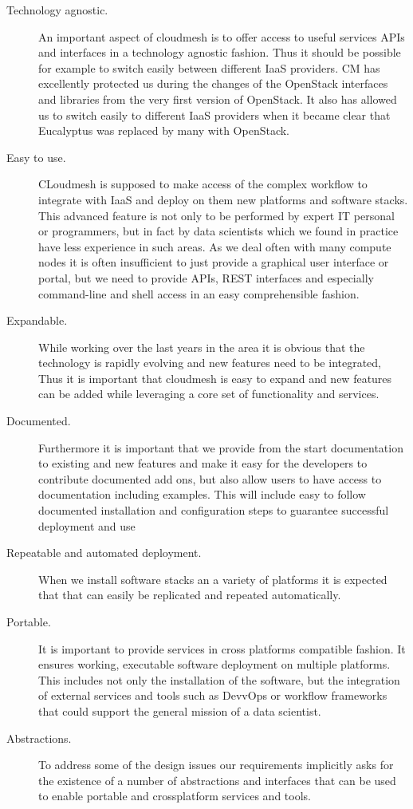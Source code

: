 \begin{description}
\item [Technology agnostic.] An important aspect of cloudmesh is to
  offer access to useful services APIs and interfaces in a technology
  agnostic fashion. Thus it should be possible for example to switch
  easily between different IaaS providers. CM has excellently protected
  us during the changes of the OpenStack interfaces and libraries from
  the very first version of OpenStack. It also has allowed us to
  switch easily to different IaaS providers when it became clear that
  Eucalyptus was replaced by many with OpenStack.

\item[Easy to use.] CLoudmesh is supposed to make access of the
  complex workflow to integrate with IaaS and deploy on them new
  platforms and software stacks. This advanced feature is not only to
  be performed by expert IT personal or programmers, but in fact by
  data scientists which we found in practice have less experience in
  such areas. As we deal often with many compute nodes it is often
  insufficient to just provide a graphical user interface or portal, but
  we need to provide APIs, REST interfaces and especially command-line
  and shell access in an easy comprehensible fashion. 

\item[Expandable.] While working over the last years in the area it is
  obvious that the technology is rapidly evolving and new features
  need to be integrated, Thus it is important that cloudmesh is easy
  to expand and new features can be added while leveraging a core set
  of functionality and services.

\item[Documented.] Furthermore it is important that we provide from
  the start documentation to existing and new features and make it
  easy for the developers to contribute documented add ons, but also
  allow users to have access to documentation including examples. This
  will include easy to follow documented installation and configuration steps 
to guarantee successful deployment and use

\item[Repeatable and automated deployment.] When we install software
  stacks an a variety of platforms it is expected that that can easily
  be replicated and repeated automatically.

\item[Portable.] It is important to provide services in cross
  platforms compatible fashion. It ensures working, executable
  software deployment on multiple platforms. This includes not only
  the installation of the software, but the integration of external
  services and tools such as DevvOps or workflow frameworks that could
  support the general mission of a data scientist.

\item[Abstractions.] To address some of the design issues our
  requirements implicitly asks for the existence of a number of
  abstractions and interfaces that can be used to enable portable and
  crossplatform services and tools.

\end{description}

